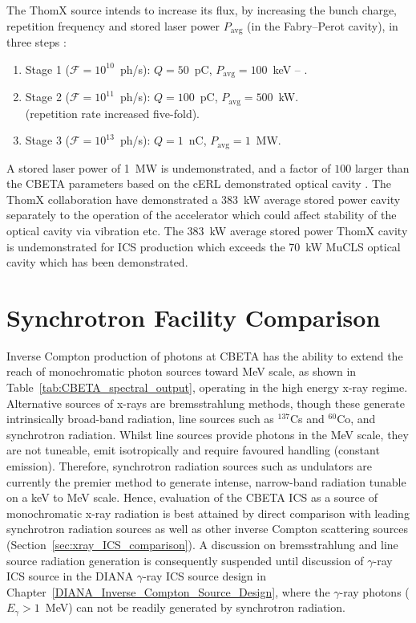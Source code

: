 \documentclass[../main.tex]{subfiles}
\begin{document}
The ThomX source intends to increase its flux, by increasing the bunch charge, repetition frequency and stored laser power $P_{\mathrm{avg}}$ (in the Fabry--Perot cavity), in three steps \cite{dupraz2020thomx}: 
\begin{enumerate}
    \item{Stage 1 ($\mathcal{F}=10^{10}$~ph/\si{\second}): $Q=50$~\si{\pico\coulomb}, $P_{\mathrm{avg}}=100$~\si{\kilo\electronvolt} -- .}
    \item{Stage 2 ($\mathcal{F}=10^{11}$~ph/\si{\second}): $Q=100$~\si{\pico\coulomb}, $P_{\mathrm{avg}} = 500$~\si{\kilo\watt}. \\ (repetition rate increased five-fold).}
    \item{Stage 3 ($\mathcal{F}=10^{13}$~ph/\si{\second}): $Q=1$~\si{\nano\coulomb}, $P_{\mathrm{avg}} = 1$~\si{\mega\watt}.}
\end{enumerate}
A stored laser power of 1~\si{\mega\watt} is undemonstrated, and a factor of $100$ larger than the CBETA parameters based on the cERL demonstrated optical cavity \cite{akagi2016narrow}. The ThomX collaboration have demonstrated a 383~\si{\kilo\watt} average stored power cavity \cite{liu2018optical} separately to the operation of the accelerator which could affect stability of the optical cavity via vibration etc. The 383~\si{\kilo\watt} average stored power ThomX cavity is undemonstrated for ICS production which exceeds the  70~\si{\kilo\watt} MuCLS \cite{eggl2016munich} optical cavity which has been demonstrated.

\section{Synchrotron Facility Comparison}
\label{sec:synchrotron_facility_comparison}

Inverse Compton production of photons at CBETA has the ability to extend the reach of monochromatic photon sources toward \si{\mega\electronvolt} scale, as shown in Table~\ref{tab:CBETA_spectral_output}, operating in the high energy x-ray regime. Alternative sources of x-rays are bremsstrahlung methods, though these generate intrinsically broad-band radiation, line sources such as $^{137}$Cs and $^{60}$Co, and synchrotron radiation. Whilst line sources provide photons in the \si{\mega\electronvolt} scale, they are not tuneable, emit isotropically and require favoured handling (constant emission). Therefore, synchrotron radiation sources such as undulators are currently the premier method to generate intense, narrow-band radiation tunable on a \si{\kilo\electronvolt} to \si{\mega\electronvolt} scale. Hence, evaluation of the CBETA ICS as a source of monochromatic x-ray radiation is best attained by direct comparison with leading synchrotron radiation sources as well as other inverse Compton scattering sources (Section~\ref{sec:xray_ICS_comparison}). A discussion on bremsstrahlung and line source radiation generation is consequently suspended until discussion of $\gamma$-ray ICS source in the DIANA $\gamma$-ray ICS source design in Chapter~\ref{DIANA_Inverse_Compton_Source_Design}, where the $\gamma$-ray photons ($E_{\gamma} > 1$~\si{\mega\electronvolt}) can not be readily generated by synchrotron radiation.   
\end{document}
